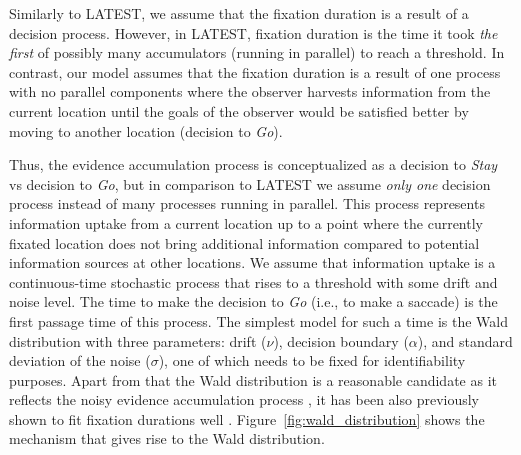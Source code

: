 \documentclass{article}
\begin{document}
Similarly to LATEST, we assume that the fixation duration is a result of a decision process. However, in LATEST, fixation duration is the time it took \textit{the first} of possibly many accumulators (running in parallel) to reach a threshold. In contrast, our model assumes that the fixation duration is a result of one process with no parallel components where the observer harvests information from the current location until the goals of the observer would be satisfied better by moving to another location (decision to \textit{Go}).

Thus, the evidence accumulation process is conceptualized as a decision to \textit{Stay} vs decision to \textit{Go}, but in comparison to LATEST we assume \textit{only one} decision process instead of many processes running in parallel. This process represents information uptake from a current location up to a point where the currently fixated location does not bring additional information compared to potential information sources at other locations. We assume that information uptake is a continuous-time stochastic process that rises to a threshold with some drift and noise level. The time to make the decision to \textit{Go} (i.e., to make a saccade) is the first passage time of this process. The simplest model for such a time is the Wald distribution with three parameters: drift ($\nu$), decision boundary ($\alpha$), and standard deviation of the noise ($\sigma$), one of which needs to be fixed for identifiability purposes. Apart from that the Wald distribution is a reasonable candidate as it reflects the noisy evidence accumulation process \citep[a process that has been deemed as a neurally plausible mechanism for decision processes, ][]{anders2016shifted}, it has been also previously shown to fit fixation durations well \citep{palmer2011shapes}. Figure~\ref{fig:wald_distribution} shows the mechanism that gives rise to the Wald distribution.
\end{document}

